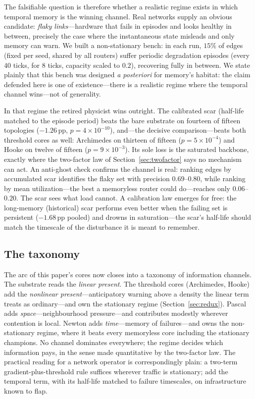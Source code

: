 The falsifiable question is therefore whether a realistic regime exists in
which temporal memory is the winning channel. Real networks supply an obvious
candidate: \emph{flaky links}---hardware that fails in episodes and looks
healthy in between, precisely the case where the instantaneous state misleads
and only memory can warn. We built a non-stationary bench: in each run,
$15\%$ of edges (fixed per seed, shared by all routers) suffer periodic
degradation episodes (every $40$ ticks, for $8$ ticks, capacity scaled to
$0.2$), recovering fully in between. We state plainly that this bench was
designed \emph{a posteriori} for memory's habitat: the claim defended here is
one of existence---there is a realistic regime where the temporal channel
wins---not of generality.

In that regime the retired physicist wins outright. The calibrated scar
(half-life matched to the episode period) beats the bare substrate on
fourteen of fifteen topologies ($-1.26$\,pp, $p=4\times10^{-10}$), and---the
decisive comparison---beats both threshold cores as well: Archimedes on
thirteen of fifteen ($p=5\times10^{-4}$) and Hooke on twelve of fifteen
($p=9\times10^{-3}$). Its sole loss is the saturated backbone, exactly where
the two-factor law of Section~\ref{sec:twofactor} says no mechanism can act.
An anti-ghost check confirms the channel is real: ranking edges by
accumulated scar identifies the flaky set with precision $0.69$--$0.80$,
while ranking by mean utilization---the best a memoryless router could
do---reaches only $0.06$--$0.20$. The scar sees what load cannot. A
calibration law emerges for free: the long-memory (historical) scar performs
even better when the failing set is persistent ($-1.68$\,pp pooled) and
drowns in saturation---the scar's half-life should match the timescale of
the disturbance it is meant to remember.

\subsection{The taxonomy}

The arc of this paper's cores now closes into a taxonomy of information
channels. The substrate reads the \emph{linear present}. The threshold cores
(Archimedes, Hooke) add the \emph{nonlinear present}---anticipatory warning
above a density the linear term treats as ordinary---and own the stationary
regime (Section~\ref{sec:redux}). Pascal adds \emph{space}---neighbourhood
pressure---and contributes modestly wherever contention is local. Newton adds
\emph{time}---memory of failures---and owns the non-stationary regime, where
it beats every memoryless core including the stationary champions. No channel
dominates everywhere; the regime decides which information pays, in the sense
made quantitative by the two-factor law. The practical reading for a network
operator is correspondingly plain: a two-term gradient-plus-threshold rule
suffices wherever traffic is stationary; add the temporal term, with its
half-life matched to failure timescales, on infrastructure known to flap.
